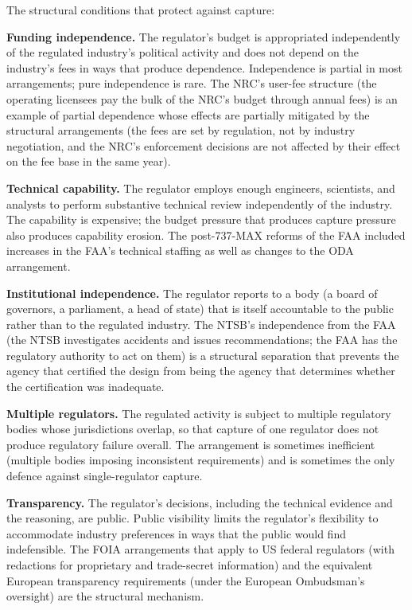 The structural conditions that protect against capture:

\textbf{Funding independence.} The regulator's budget is appropriated independently of the regulated industry's political activity and does not depend on the industry's fees in ways that produce dependence. Independence is partial in most arrangements; pure independence is rare. The NRC's user-fee structure (the operating licensees pay the bulk of the NRC's budget through annual fees) is an example of partial dependence whose effects are partially mitigated by the structural arrangements (the fees are set by regulation, not by industry negotiation, and the NRC's enforcement decisions are not affected by their effect on the fee base in the same year).

\textbf{Technical capability.} The regulator employs enough engineers, scientists, and analysts to perform substantive technical review independently of the industry. The capability is expensive; the budget pressure that produces capture pressure also produces capability erosion. The post-737-MAX reforms of the FAA included increases in the FAA's technical staffing as well as changes to the ODA arrangement.

\textbf{Institutional independence.} The regulator reports to a body (a board of governors, a parliament, a head of state) that is itself accountable to the public rather than to the regulated industry. The NTSB's independence from the FAA (the NTSB investigates accidents and issues recommendations; the FAA has the regulatory authority to act on them) is a structural separation that prevents the agency that certified the design from being the agency that determines whether the certification was inadequate.

\textbf{Multiple regulators.} The regulated activity is subject to multiple regulatory bodies whose jurisdictions overlap, so that capture of one regulator does not produce regulatory failure overall. The arrangement is sometimes inefficient (multiple bodies imposing inconsistent requirements) and is sometimes the only defence against single-regulator capture.

\textbf{Transparency.} The regulator's decisions, including the technical evidence and the reasoning, are public. Public visibility limits the regulator's flexibility to accommodate industry preferences in ways that the public would find indefensible. The FOIA arrangements that apply to US federal regulators (with redactions for proprietary and trade-secret information) and the equivalent European transparency requirements (under the European Ombudsman's oversight) are the structural mechanism.


